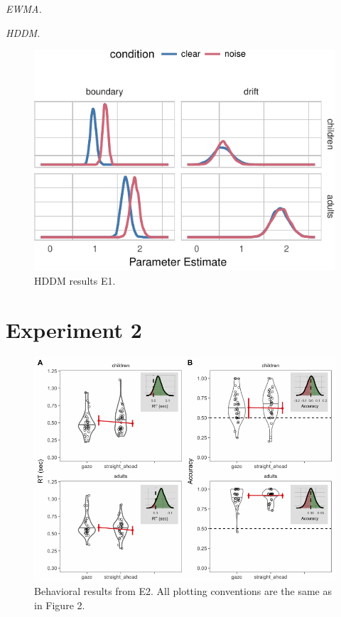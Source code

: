 \documentclass[10pt, letterpaper]{article}
\newenvironment{CodeChunk}{}{}
\begin{document}
\emph{EWMA.}

\emph{HDDM.}

\begin{CodeChunk}
\begin{figure}[t]

{\centering \includegraphics[width=0.85\linewidth]{figs/hddm_plot_noise-1} 

}

\caption[HDDM results E1]{HDDM results E1.}\label{fig:hddm_plot_noise}
\end{figure}
\end{CodeChunk}

\section{Experiment 2}\label{experiment-2}

\begin{CodeChunk}
\begin{figure}[t]

{\centering \includegraphics[width=0.8\linewidth]{figs/gaze_acc_rt_e2_plot-1} 

}

\caption[Behavioral results from E2]{Behavioral results from E2. All plotting conventions are the same as in Figure 2.}\label{fig:gaze_acc_rt_e2_plot}
\end{figure}
\end{CodeChunk}
\end{document}
